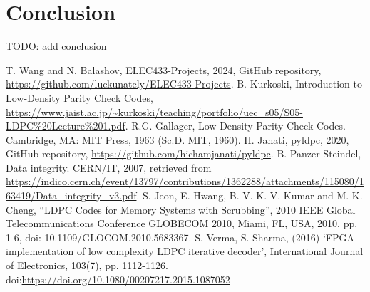 \documentclass[conference]{IEEEtran}
\begin{document}

\section{Conclusion}
TODO: add conclusion

\begin{thebibliography}{00}
   T. Wang and N. Balashov, ELEC433-Projects, 2024, GitHub repository, \url{https://github.com/luckunately/ELEC433-Projects}.
   B. Kurkoski, Introduction to Low-Density Parity Check Codes, \url{https://www.jaist.ac.jp/~kurkoski/teaching/portfolio/uec_s05/S05-LDPC%20Lecture%201.pdf}.
   R.G. Gallager, Low-Density Parity-Check Codes. Cambridge, MA: MIT Press, 1963 (Sc.D. MIT, 1960).
   H. Janati, pyldpc, 2020, GitHub repository, \url{https://github.com/hichamjanati/pyldpc}.
   B. Panzer-Steindel, Data integrity. CERN/IT, 2007, retrieved from \url{https://indico.cern.ch/event/13797/contributions/1362288/attachments/115080/163419/Data_integrity_v3.pdf}.
  S. Jeon, E. Hwang, B. V. K. V. Kumar and M. K. Cheng, ``LDPC Codes for Memory Systems with Scrubbing'', 2010 IEEE Global Telecommunications Conference GLOBECOM 2010, Miami, FL, USA, 2010, pp. 1-6, doi: 10.1109/GLOCOM.2010.5683367.
   S. Verma, S. Sharma, (2016) `FPGA implementation of low complexity LDPC iterative decoder', International Journal of Electronics, 103(7), pp. 1112-1126. doi:\url{https://doi.org/10.1080/00207217.2015.1087052}
\end{thebibliography}
\end{document}
